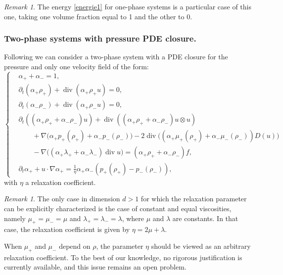 \documentclass[11pt, twoside, a4paper]{article}
\theoremstyle{plain}
\theoremstyle{remark}
\newtheorem{remark}[theorem]{Remark}
\numberwithin{equation}{section}
\renewcommand{\div}{\operatorname{div}}
\newcommand{\dt}{\partial_t}
\newcommand{\ap}{\alpha_+}
\newcommand{\am}{\alpha_-}
\newcommand{\rp}{\rho_+}
\newcommand{\rmi}{\rho_-}
\begin{document}
\begin{remark} The energy \eqref{energie1} for one-phase systems is a particular case of this one, taking one volume fraction equal to 1 and the other to 0.\\
\end{remark}

\subsubsection{Two-phase systems with pressure PDE closure.}

Following \cite{bresch2024mathematical} we can consider a two-phase system with a PDE closure for the pressure and only one velocity field of the form:
\begin{equation}
    \left\{
        \begin{aligned}\label{PDE1velocity}
            &\ap + \am = 1,\\
            &\dt (\ap \rp) + \div(\ap \rp u) = 0,\\
            &\dt (\am \rmi) + \div(\ap \rmi u) = 0,\\
            &\dt ((\ap \rp + \am \rmi) u) + \div ((\ap \rp + \am \rmi) u \otimes u)\\
            &\quad \quad + \nabla \Big(\ap p_+(\rp) + \am p_-(\rmi)\Big)- 2 \div \Big( (\ap \mu_+(\rp) + \am \mu_-(\rmi)) D(u) \Big)\\
            &\quad \quad  - \nabla \Big( (\ap \lambda_+ + \am \lambda_-) \div u \Big) = (\ap \rp + \am \rmi) f,\\
            &\dt \ap + u \cdot \nabla \ap = \frac{1}{\eta} \ap \am (p_+(\rp)-p_-(\rmi)),
        \end{aligned}
    \right .
\end{equation}
with $\eta$ a relaxation coefficient.

\begin{remark}
    The only case in dimension $d>1$ for which the relaxation parameter can be explicitly characterized is the case of constant and equal viscosities, namely $\mu_+ = \mu_- = \mu$ and $\lambda_+ = \lambda_- = \lambda$, where $\mu$ and $\lambda$ are constants. In that case, the relaxation coefficient is given by $\eta = 2\mu + \lambda$.
    
    When $\mu_+$ and $\mu_-$ depend on $\rho$, the parameter $\eta$ should be viewed as an arbitrary relaxation coefficient. To the best of our knowledge, no rigorous justification is currently available, and this issue remains an open problem.
\end{remark}
\end{document}

